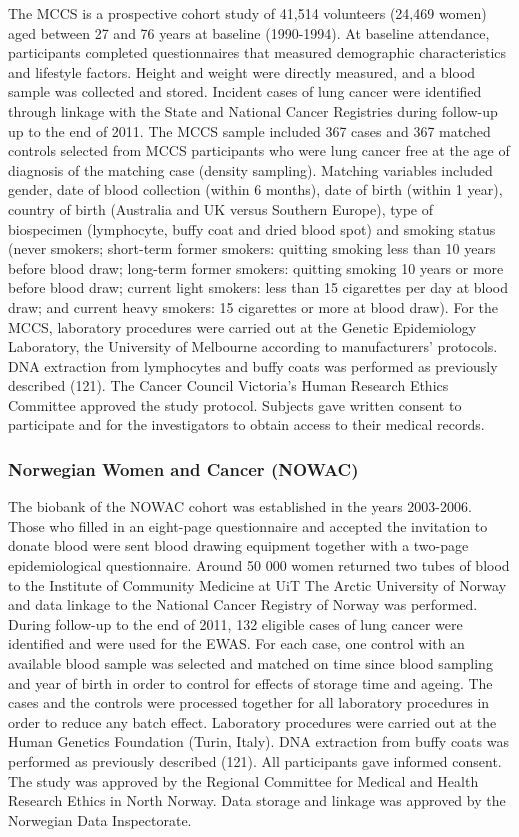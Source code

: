 \documentclass[11pt,oneside]{bristolthesis}
\begin{document}
The MCCS is a prospective cohort study of 41,514 volunteers (24,469 women) aged between 27 and 76 years at baseline (1990-1994). At baseline attendance, participants completed questionnaires that measured demographic characteristics and lifestyle factors. Height and weight were directly measured, and a blood sample was collected and stored. Incident cases of lung cancer were identified through linkage with the State and National Cancer Registries during follow-up up to the end of 2011. The MCCS sample included 367 cases and 367 matched controls selected from MCCS participants who were lung cancer free at the age of diagnosis of the matching case (density sampling). Matching variables included gender, date of blood collection (within 6 months), date of birth (within 1 year), country of birth (Australia and UK versus Southern Europe), type of biospecimen (lymphocyte, buffy coat and dried blood spot) and smoking status (never smokers; short-term former smokers: quitting smoking less than 10 years before blood draw; long-term former smokers: quitting smoking 10 years or more before blood draw; current light smokers: less than 15 cigarettes per day at blood draw; and current heavy smokers: 15 cigarettes or more at blood draw). For the MCCS, laboratory procedures were carried out at the Genetic Epidemiology Laboratory, the University of Melbourne according to manufacturers' protocols. DNA extraction from lymphocytes and buffy coats was performed as previously described (121). The Cancer Council Victoria's Human Research Ethics Committee approved the study protocol. Subjects gave written consent to participate and for the investigators to obtain access to their medical records.

\hypertarget{norwegian-women-and-cancer-nowac}{%
\subsubsection{Norwegian Women and Cancer (NOWAC)}\label{norwegian-women-and-cancer-nowac}}

The biobank of the NOWAC cohort was established in the years 2003-2006. Those who filled in an eight-page questionnaire and accepted the invitation to donate blood were sent blood drawing equipment together with a two-page epidemiological questionnaire. Around 50 000 women returned two tubes of blood to the Institute of Community Medicine at UiT The Arctic University of Norway and data linkage to the National Cancer Registry of Norway was performed. During follow-up to the end of 2011, 132 eligible cases of lung cancer were identified and were used for the EWAS. For each case, one control with an available blood sample was selected and matched on time since blood sampling and year of birth in order to control for effects of storage time and ageing. The cases and the controls were processed together for all laboratory procedures in order to reduce any batch effect. Laboratory procedures were carried out at the Human Genetics Foundation (Turin, Italy). DNA extraction from buffy coats was performed as previously described (121). All participants gave informed consent. The study was approved by the Regional Committee for Medical and Health Research Ethics in North Norway. Data storage and linkage was approved by the Norwegian Data Inspectorate.
\end{document}
